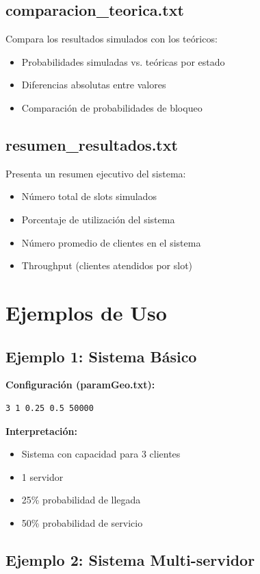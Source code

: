 \documentclass{article}
\begin{document}
\subsection{comparacion\_teorica.txt}
Compara los resultados simulados con los teóricos:
\begin{itemize}
    \item Probabilidades simuladas vs. teóricas por estado
    \item Diferencias absolutas entre valores
    \item Comparación de probabilidades de bloqueo
\end{itemize}

\subsection{resumen\_resultados.txt}
Presenta un resumen ejecutivo del sistema:
\begin{itemize}
    \item Número total de slots simulados
    \item Porcentaje de utilización del sistema
    \item Número promedio de clientes en el sistema
    \item Throughput (clientes atendidos por slot)
\end{itemize}

\section{Ejemplos de Uso}

\subsection{Ejemplo 1: Sistema Básico}

\textbf{Configuración (paramGeo.txt):}
\begin{lstlisting}
3 1 0.25 0.5 50000
\end{lstlisting}

\textbf{Interpretación:}
\begin{itemize}
    \item Sistema con capacidad para 3 clientes
    \item 1 servidor
    \item 25\% probabilidad de llegada
    \item 50\% probabilidad de servicio
\end{itemize}

\subsection{Ejemplo 2: Sistema Multi-servidor}
\end{document}
